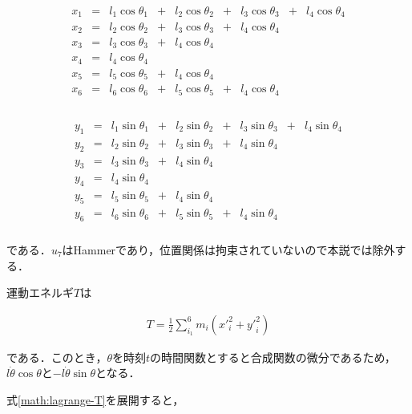 \begin{eqnarray}
    \begin{matrix}
        x_1 &=& l_1 \cos \theta_1 &+& l_2 \cos \theta_2 &+& l_3 \cos \theta_3 &+& l_4 \cos \theta_4\\
        x_2 &=& l_2 \cos \theta_2 &+& l_3 \cos \theta_3 &+& l_4 \cos \theta_4 & & \\
        x_3 &=& l_3 \cos \theta_3 &+& l_4 \cos \theta_4 & & & &\\
        x_4 &=& l_4 \cos \theta_4 & & & & & &\\
        x_5 &=& l_5 \cos \theta_5 &+& l_4 \cos \theta_4 & & & &\\
        x_6 &=& l_6 \cos \theta_6 &+& l_5 \cos \theta_5 &+& l_4 \cos \theta_4 & &\\
    \end{matrix}
\end{eqnarray}

\begin{eqnarray}
    \begin{matrix}
        y_1 &=& l_1 \sin \theta_1 &+& l_2 \sin \theta_2 &+& l_3 \sin \theta_3 &+& l_4 \sin \theta_4\\
        y_2 &=& l_2 \sin \theta_2 &+& l_3 \sin \theta_3 &+& l_4 \sin \theta_4 & & \\
        y_3 &=& l_3 \sin \theta_3 &+& l_4 \sin \theta_4 & & & &\\
        y_4 &=& l_4 \sin \theta_4 & & & & & &\\
        y_5 &=& l_5 \sin \theta_5 &+& l_4 \sin \theta_4 & & & &\\
        y_6 &=& l_6 \sin \theta_6 &+& l_5 \sin \theta_5 &+& l_4 \sin \theta_4 & & \\
    \end{matrix}
\end{eqnarray}

である．$u_7$はHammerであり，位置関係は拘束されていないので本説では除外する．

運動エネルギ$T$は

\begin{eqnarray}
    \label{math:lagrange-T}
    T = \frac{1}{2} \sum^6_{i_1} m_i({x'}_i^2 + {y'}_i^2)
\end{eqnarray}

である．このとき，$\theta$を時刻$t$の時間関数とすると合成関数の微分であるため，$l \dot{\theta} \cos \theta$と$-l \dot{\theta} \sin \theta$となる．

式\ref{math:lagrange-T}を展開すると，

